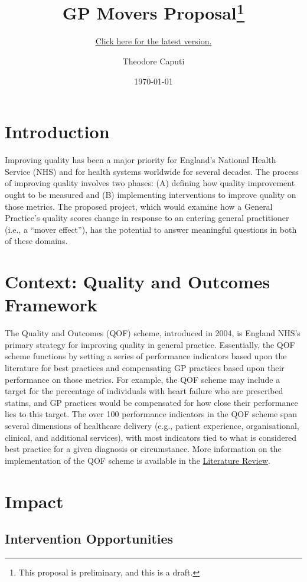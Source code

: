 \documentclass[12pt]{article}
\subtitle{\href{https://www.TheodoreCaputi.com/files/proposal.pdf}{Click here for the latest version.}}
\title{GP Movers Proposal\footnote{This proposal is preliminary, and this is a draft.}}
\author{Theodore Caputi}
\date{\today}
\begin{document}
\maketitle

\section{Introduction}

Improving quality has been a major priority for England's National Health Service (NHS) and for health systems worldwide for several decades. The process of improving quality involves two phases: (A) defining how quality improvement ought to be measured and (B) implementing interventions to improve quality on those metrics. The proposed project, which would examine how a General Practice's quality scores change in response to an entering general practitioner (i.e., a ``mover effect''), has the potential to answer meaningful questions in both of these domains.

\section{Context: Quality and Outcomes Framework}

The Quality and Outcomes (QOF) scheme, introduced in 2004, is England NHS's primary strategy for improving quality in general practice. Essentially, the QOF scheme functions by setting a series of performance indicators based upon the literature for best practices and compensating GP practices based upon their performance on those metrics. For example, the QOF scheme may include a target for the percentage of individuals with heart failure who are prescribed statins, and GP practices would be compensated for how close their performance lies to this target. The over 100 performance indicators in the QOF scheme span several dimensions of healthcare delivery (e.g., patient experience, organisational, clinical, and additional services), with most indicators tied to what is considered best practice for a given diagnosis or circumstance. More information on the implementation of the QOF scheme is available in the \href{https://www.TheodoreCaputi.com/files/qof.pdf}{Literature Review}.


\section{Impact}


\subsection{Intervention Opportunities}
\end{document}
